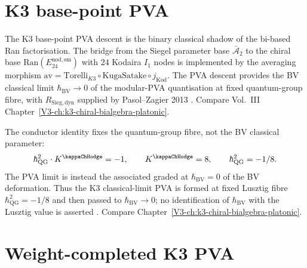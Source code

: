 \section{K3 base-point PVA}
\label{sec:pvadr-supplement}

\begin{remark}
\label{rem:pvadr-1}
The K3 base-point PVA descent is the binary classical shadow of the
bi-based Ran factorisation. The bridge from the Siegel parameter base
$\bar{\mathcal A}_2$ to the chiral base
$\mathrm{Ran}(E^{\mathrm{nod,sm}}_{24})$ with $24$ Kodaira $I_1$
nodes is implemented by the averaging morphism
$\mathrm{av} = \mathrm{Torelli}_{K3}\circ\mathrm{KugaSatake}\circ j_{\mathrm{Kod}}$.
The PVA descent provides the BV classical limit
$\hbar_{\mathrm{BV}}\to 0$ of the modular-PVA quantisation at fixed
quantum-group fibre, with $R_{\mathrm{Sieg,dyn}}$ supplied by
Pasol--Zagier 2013
\cite{KugaSatake1967,PasolZagier2013}. Compare Vol.~III
Chapter~\ref{V3-ch:k3-chiral-bialgebra-platonic}.
\end{remark}

\begin{remark}
\label{rem:pvadr-2}
The conductor identity fixes the quantum-group fibre, not the BV
classical parameter:
\[
\hbar_{\mathrm{QG}}^2\cdot K^{\kappaChHodge}=-1,\qquad
K^{\kappaChHodge}=8,\qquad
\hbar_{\mathrm{QG}}^2=-1/8.
\]
The PVA limit is instead the associated graded at
$\hbar_{\mathrm{BV}}=0$ of the BV deformation. Thus the K3
classical-limit PVA is formed at fixed Lusztig fibre
$\hbar_{\mathrm{QG}}^2=-1/8$ and then passed to
$\hbar_{\mathrm{BV}}\to0$; no identification of
$\hbar_{\mathrm{BV}}$ with the Lusztig value is asserted
\cite{Lusztig1990}.
Compare Chapter~\ref{V3-ch:k3-chiral-bialgebra-platonic}.
\end{remark}

\section{Weight-completed K3 PVA}
\label{sec:pvadr-supplement-ii}

